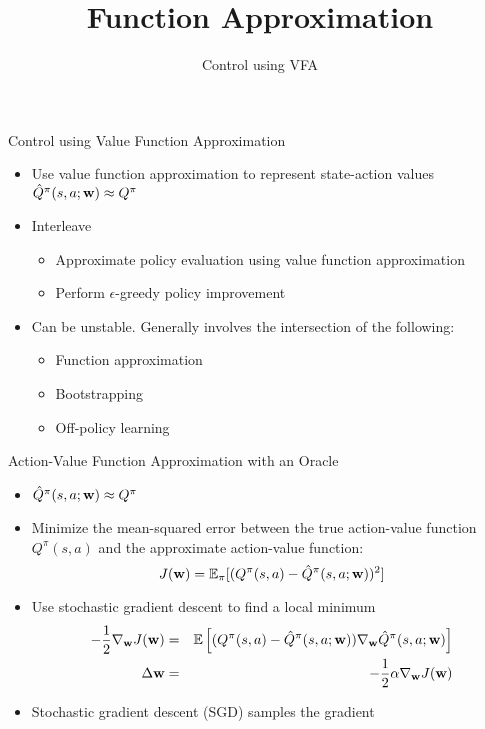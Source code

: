 \documentclass[aspectratio=169]{../latex_main/tntbeamer}  %
\title[RL: Function Approximation]{Function Approximation}
\subtitle{Control using VFA}
\begin{document}
	
	\maketitle

\begin{frame}[c]{Control using Value Function Approximation}
	
	\begin{itemize}
		\item Use value function approximation to represent state-action values $\hat{Q}^\pi(s,a;\mathbf{w}) \approx Q^\pi$
		\item Interleave
		\begin{itemize}
			\item Approximate policy evaluation using value function approximation
			\item Perform $\epsilon$-greedy policy improvement
		\end{itemize}
		\item Can be unstable. Generally involves the intersection of the following:
		\begin{itemize}
			\item Function approximation
			\item Bootstrapping
			\item \alert{Off-policy learning}
		\end{itemize}
	\end{itemize}

\end{frame}
\begin{frame}[c]{Action-Value Function Approximation with an Oracle}

	\begin{itemize}
		\item $\hat{Q}^\pi(s,a;\mathbf{w}) \approx Q^\pi$
		\item Minimize the mean-squared error between the true action-value function $Q^\pi(s,a)$ and the approximate action-value function:
		$$J(\mathbf{w}) = \mathbb{E}_\pi [(Q^\pi(s,a) - \hat{Q}^\pi(s,a;\mathbf{w}))^2] $$
		\item Use stochastic gradient descent to find a local minimum
		\begin{eqnarray}
			-\frac{1}{2}\nabla_{\mathbf{w}} J(\mathbf{w}) &=& \mathbb{E}\left[ (Q^\pi(s,a) - \hat{Q}^\pi(s,a;\mathbf{w})) \nabla_{\mathbf{w}} \hat{Q}^\pi(s,a;\mathbf{w}) \right]\nonumber\\
			\Delta \mathbf{w} &=& -\frac{1}{2}\alpha\nabla_{\mathbf{w}} J(\mathbf{w})\nonumber
		\end{eqnarray}
		\item Stochastic gradient descent (SGD) samples the gradient
	\end{itemize}

\end{frame}
\end{document}
